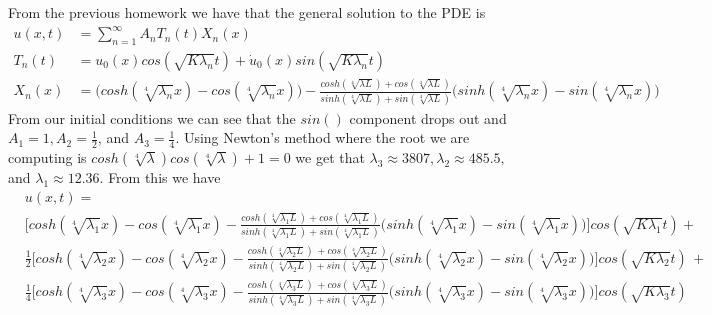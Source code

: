 \documentclass[12pt]{article}
\theoremstyle{remark}
\begin{document}
From the previous homework we have that the general solution to the PDE is 
\begin{align*}
		u(x,t) & = \sum\limits_{n=1}^\infty A_nT_n(t)X_n(x) \\
		T_n(t) & = u_0(x)cos(\sqrt{K\lambda_n}t) + \dot{u}_0(x)sin(\sqrt{K\lambda_n}t) \\
		X_n(x) & = \bigg(cosh(\sqrt[4]{\lambda_n}x) - cos(\sqrt[4]{\lambda_n}x)\bigg) - \frac{cosh(\sqrt[4]{\lambda L}) + cos(\sqrt[4]{\lambda L})}{sinh(\sqrt[4]{\lambda L}) + sin(\sqrt[4]{\lambda L})}\bigg(sinh(\sqrt[4]{\lambda_n}x) - sin(\sqrt[4]{\lambda_n}x)\bigg)
\end{align*}
From our initial conditions we can see that the $sin()$ component drops out and $A_1 = 1, A_2 = \frac{1}{2}$, and $A_3 = \frac{1}{4}$. Using Newton's method where the root we are computing is $cosh(\sqrt[4]{\lambda})cos(\sqrt[4]{\lambda}) + 1 = 0$ we get that $\lambda_3 \approx 3807, \lambda_2 \approx 485.5,$ and $\lambda_1 \approx 12.36$. From this we have 
\begin{align*}
	& u(x,t) = \\
	& \bigg[cosh(\sqrt[4]{\lambda_1}x) - cos(\sqrt[4]{\lambda_1}x) - \frac{cosh(\sqrt[4]{\lambda_1 L}) + cos(\sqrt[4]{\lambda_1 L})}{sinh(\sqrt[4]{\lambda_1 L}) + sin(\sqrt[4]{\lambda_1 L})}\bigg(sinh(\sqrt[4]{\lambda_1}x) - sin(\sqrt[4]{\lambda_1}x)\bigg)\bigg]cos(\sqrt{K\lambda_1}t) + \\
	& \frac{1}{2}\bigg[cosh(\sqrt[4]{\lambda_2}x) - cos(\sqrt[4]{\lambda_2}x) - \frac{cosh(\sqrt[4]{\lambda_2 L}) \, + cos(\sqrt[4]{\lambda_2 L})}{sinh(\sqrt[4]{\lambda_2 L}) + sin(\sqrt[4]{\lambda_2 L})}\bigg(sinh(\sqrt[4]{\lambda_2}x) - sin(\sqrt[4]{\lambda_2}x)\bigg)\bigg]cos(\sqrt{K\lambda_2}t) \, + \\
	& \frac{1}{4}\bigg[cosh(\sqrt[4]{\lambda_3}x) - cos(\sqrt[4]{\lambda_3}x) - \frac{cosh(\sqrt[4]{\lambda_3 L}) \, + cos(\sqrt[4]{\lambda_3 L})}{sinh(\sqrt[4]{\lambda_3 L}) + sin(\sqrt[4]{\lambda_3 L})}\bigg(sinh(\sqrt[4]{\lambda_3}x) - sin(\sqrt[4]{\lambda_3}x)\bigg)\bigg]cos(\sqrt{K\lambda_3}t)
\end{align*} \\
\end{document}
